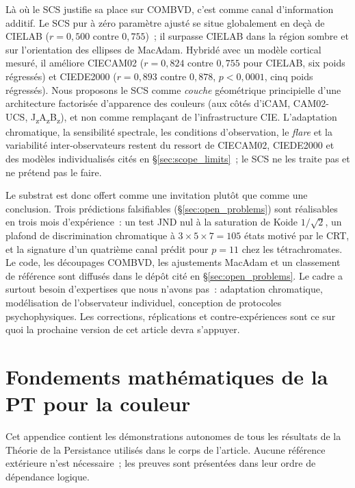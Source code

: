 \documentclass[12pt,a4paper]{article}
\begin{document}
L\`a o\`u le SCS justifie sa place sur COMBVD, c'est comme canal
d'information additif. Le SCS pur \`a z\'ero param\`etre ajust\'e se
situe globalement en de\c{c}\`a de CIELAB ($r = 0{,}500$ contre
$0{,}755$)~; il surpasse CIELAB dans la r\'egion sombre et sur
l'orientation des ellipses de MacAdam. Hybrid\'e avec un mod\`ele
cortical mesur\'e, il am\'eliore CIECAM02 ($r = 0{,}824$ contre
$0{,}755$ pour CIELAB, six poids r\'egress\'es) et CIEDE2000
($r = 0{,}893$ contre $0{,}878$, $p < 0{,}0001$, cinq poids
r\'egress\'es). Nous proposons le SCS comme \emph{couche}
g\'eom\'etrique principielle d'une architecture factoris\'ee
d'apparence des couleurs (aux c\^ot\'es d'iCAM, CAM02-UCS,
J\textsubscript{z}A\textsubscript{z}B\textsubscript{z}), et non comme
rempla\c{c}ant de l'infrastructure CIE. L'adaptation chromatique, la
sensibilit\'e spectrale, les conditions d'observation, le
\emph{flare} et la variabilit\'e inter-observateurs restent du ressort
de CIECAM02, CIEDE2000 et des mod\`eles individualis\'es cit\'es en
\S\ref{sec:scope_limits}~; le SCS ne les traite pas et ne pr\'etend
pas le faire.

Le substrat est donc offert comme une invitation plut\^ot que comme
une conclusion. Trois pr\'edictions falsifiables
(\S\ref{sec:open_problems}) sont r\'ealisables en trois mois
d'exp\'erience~: un test JND nul \`a la saturation de Koide
$1/\sqrt{2}$, un plafond de discrimination chromatique \`a
$3\times 5\times 7 = 105$ \'etats motiv\'e par le CRT, et la signature
d'un quatri\`eme canal pr\'edit pour $p = 11$ chez les t\'etrachromates.
Le code, les d\'ecoupages COMBVD, les ajustements MacAdam et un
classement de r\'ef\'erence sont diffus\'es dans le d\'ep\^ot cit\'e
en \S\ref{sec:open_problems}. Le cadre a surtout besoin d'expertises
que nous n'avons pas~: adaptation chromatique, mod\'elisation de
l'observateur individuel, conception de protocoles psychophysiques.
Les corrections, r\'eplications et contre-exp\'eriences sont ce sur
quoi la prochaine version de cet article devra s'appuyer.

\appendix
\section{Fondements math\'ematiques de la PT pour la couleur}
\label{app:pt_proofs}

Cet appendice contient les d\'emonstrations autonomes de tous les
r\'esultats de la Th\'eorie de la Persistance utilis\'es dans le corps
de l'article. Aucune r\'ef\'erence ext\'erieure n'est n\'ecessaire~;
les preuves sont pr\'esent\'ees dans leur ordre de d\'ependance logique.
\end{document}
